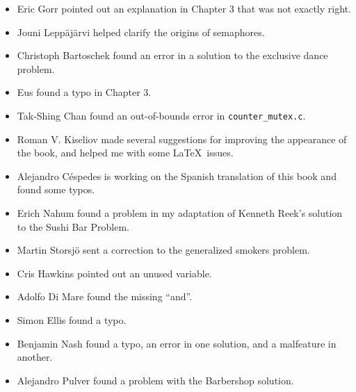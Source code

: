 \begin{itemize}
\item Eric Gorr pointed out an explanation in Chapter 3 that was
not exactly right.

\item Jouni Lepp\"{a}j\"{a}rvi helped clarify the origins of semaphores.

\item Christoph Bartoschek found an error in a solution to
the exclusive dance problem.

\item Eus found a typo in Chapter 3.

\item Tak-Shing Chan found an out-of-bounds error in {\tt counter\_mutex.c}.

\item Roman V. Kiseliov made several suggestions for improving
the appearance of the book, and helped me with some \LaTeX~issues.

\item Alejandro C\'{e}spedes is working on the Spanish translation of this
book and found some typos.

\item Erich Nahum found a problem in my adaptation of Kenneth Reek's
  solution to the Sushi Bar Problem.

\item Martin Storsj\"{o} sent a correction to the generalized smokers problem.

\item Cris Hawkins pointed out an unused variable.

\item Adolfo Di Mare found the missing ``and''.

\item Simon Ellis found a typo.

\item Benjamin Nash found a typo, an error in one solution, and
a malfeature in another.

\item Alejandro Pulver found a problem with the Barbershop solution.

\end{itemize}


\tableofcontents
\clearemptydoublepage

\mainmatter
